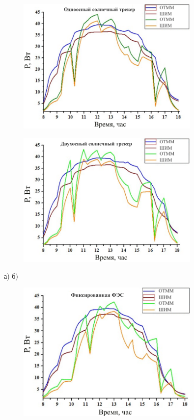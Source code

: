 \begin{figure}[H]
	\centering
	\includegraphics[width=0.8\textwidth]{media/ict/image13}
	\caption*{}
\end{figure}

\begin{figure}[H]
	\centering
	\includegraphics[width=0.8\textwidth]{media/ict/image14}
	\caption*{}
\end{figure}


а) б)


\begin{figure}[H]
	\centering
	\includegraphics[width=0.8\textwidth]{media/ict/image15}
	\caption*{}
\end{figure}


